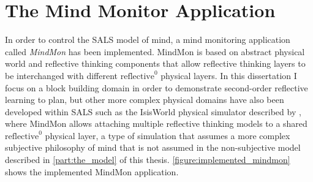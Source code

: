 \chapter{The Mind Monitor Application}
\label{chapter:the_mind_monitor_application}

In order to control the SALS model of mind, a mind monitoring
application called \emph{MindMon} has been implemented.  MindMon is
based on abstract physical world and reflective thinking components
that allow reflective thinking layers to be interchanged with
different $\text{reflective}^0$ physical layers.  In this dissertation
I focus on a block building domain in order to demonstrate
second-order reflective learning to plan, but other more complex
physical domains have also been developed within SALS such as the
IsisWorld physical simulator described by \cite{smith:2010}, where
MindMon allows attaching multiple reflective thinking models to a
shared $\text{reflective}^0$ physical layer, a type of simulation that
assumes a more complex subjective philosophy of mind that is not
assumed in the non-subjective model described in
{\mbox{\autoref{part:the_model}}} of this thesis.
{\mbox{\autoref{figure:implemented_mindmon}}} shows the implemented
MindMon application.
